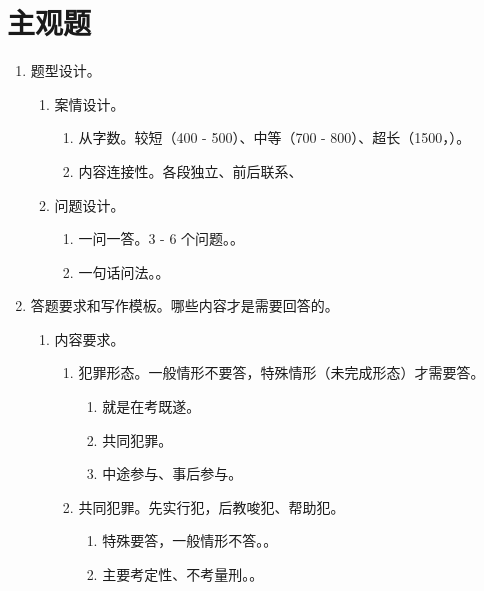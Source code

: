 \chapter{主观题}
\begin{enumerate}
  \item 题型设计。
        \begin{enumerate}
          \item 案情设计。
                \begin{enumerate}
                  \item 从字数。较短（400 - 500）、中等（700 - 800）、超长（1500，）。
                  \item 内容连接性。各段独立、前后联系、
                \end{enumerate}
          \item 问题设计。
                \begin{enumerate}
                  \item 一问一答。3 - 6 个问题。。
                  \item 一句话问法。。
                \end{enumerate}
        \end{enumerate}
  \item 答题要求和写作模板。哪些内容才是需要回答的。
        \begin{enumerate}
          \item 内容要求。
                \begin{enumerate}
                  \item 犯罪形态。一般情形不要答，特殊情形（未完成形态）才需要答。
                        \begin{enumerate}
                          \item 就是在考既遂。
                          \item 共同犯罪。
                          \item 中途参与、事后参与。
                        \end{enumerate}
                  \item 共同犯罪。先实行犯，后教唆犯、帮助犯。
                        \begin{enumerate}
                          \item 特殊要答，一般情形不答。。
                          \item 主要考定性、不考量刑。。
                        \end{enumerate}

\end{enumerate}
\end{enumerate}
\end{enumerate}
